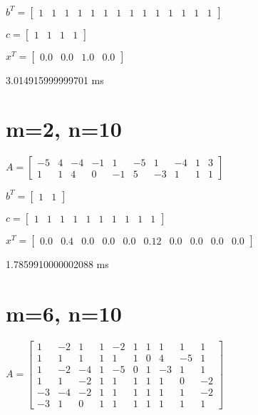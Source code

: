 \documentclass[8pt]{article}
\begin{document}
$ b^T =
\begin{bmatrix}
  1  &  1  &  1  &  1  &  1  &  1  &  1  &  1  &  1  &  1  &  1  &  1  &  1  &  1 
\end{bmatrix}
$


$ c =
\begin{bmatrix}
  1  &  1  &  1  &  1 
\end{bmatrix}
$


$ x^T =
\begin{bmatrix}
  0.0 &  0.0 &  1.0 &  0.0
\end{bmatrix}
$


3.014915999999701  ms


\section{ m=2, n=10 }



$ A =
\begin{bmatrix}
 -5  &  4  & -4  & -1  &  1  & -5  &  1  & -4  &  1  &  3 \\
  1  &  1  &  4  &  0  & -1  &  5  & -3  &  1  &  1  &  1 
\end{bmatrix}
$


$ b^T =
\begin{bmatrix}
  1  &  1 
\end{bmatrix}
$


$ c =
\begin{bmatrix}
  1  &  1  &  1  &  1  &  1  &  1  &  1  &  1  &  1  &  1 
\end{bmatrix}
$


$ x^T =
\begin{bmatrix}
  0.0 &  0.4 &  0.0 &  0.0 &  0.0 &  0.12 &  0.0 &  0.0 &  0.0 &  0.0
\end{bmatrix}
$


1.7859910000002088  ms


\section{ m=6, n=10 }



$ A =
\begin{bmatrix}
  1  & -2  &  1  &  1  & -2  &  1  &  1  &  1  &  1  &  1 \\
  1  &  1  &  1  &  1  &  1  &  1  &  0  &  4  & -5  &  1 \\
  1  & -2  & -4  &  1  & -5  &  0  &  1  & -3  &  1  &  1 \\
  1  &  1  & -2  &  1  &  1  &  1  &  1  &  1  &  0  & -2 \\
 -3  & -4  & -2  &  1  &  1  &  1  &  1  &  1  &  1  & -2 \\
 -3  &  1  &  0  &  1  &  1  &  1  &  1  &  1  &  1  &  1 
\end{bmatrix}
$
\end{document}
